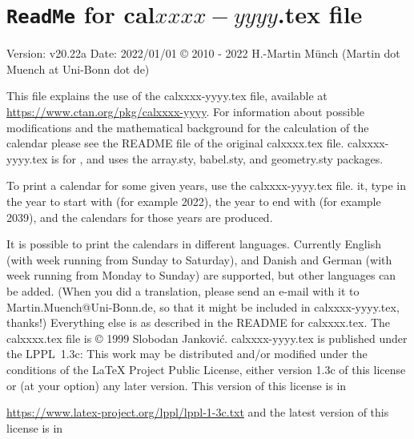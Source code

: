 \documentclass{article}
\begin{document}
\section*{\texttt{ReadMe} for cal$xxxx-yyyy$.tex file}
Version: v20.22a\newline
Date: 2022/01/01\newline
\copyright{} 2010 - 2022 H.-Martin M\"{u}nch (Martin dot Muench at Uni-Bonn dot de)\newline

\noindent This file explains the use of the \textsf{calxxxx-yyyy.tex} file,
available at\newline
\url{https://www.ctan.org/pkg/calxxxx-yyyy}.\newline
\noindent For information about possible modifications and the mathematical background
for the calculation of the calendar please see the README file of the original
\textsf{calxxxx.tex} file. \textsf{calxxxx-yyyy.tex} is for \LaTeXe, and uses
the \textsf{array.sty}, \textsf{babel.sty}, and \textsf{geometry.sty} packages.

\hspace*{-1.98471pt}To print a calendar for some given years,
use the \textsf{calxxxx-yyyy.tex} file. \LaTeXe{} it, type in the year to start with
(for example 2022), the year to end with (for example 2039), and the calendars
for those years are produced.

It is possible to print the calendars in different languages. Currently
English (with week running from Sunday to Saturday),
and Danish and German (with week running from Monday to Sunday) are supported,
but other languages can be added. (When you did a translation, please send
an e-mail with it to {\nolinebreak Martin.Muench@Uni-Bonn.de,}
so that it might be included in \textsf{calxxxx-yyyy.tex}, thanks!)\newline
Everything else is as described in the README for \textsf{calxxxx.tex}.\newline
The \textsf{calxxxx.tex} file is \copyright{} 1999 Slobodan Jankovi\'{c}.\newline
\textsf{calxxxx-yyyy.tex} is published under the LPPL~1.3c: This work may be
distributed and/or modified under the conditions of the \LaTeX{} Project
Public License, either version 1.3c of this license or (at your option) any
later version. This version of this license is in

\url{https://www.latex-project.org/lppl/lppl-1-3c.txt}\newline
and the latest version of this license is in
\end{document}
